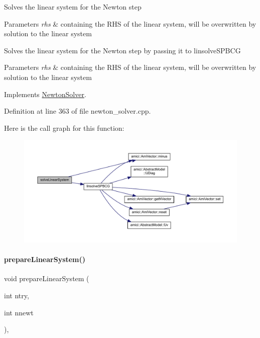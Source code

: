 Solves the linear system for the Newton step


\begin{DoxyParams}{Parameters}
{\em rhs} & containing the R\+HS of the linear system, will be overwritten by solution to the linear system \\
\hline
\end{DoxyParams}
Solves the linear system for the Newton step by passing it to linsolve\+S\+P\+B\+CG


\begin{DoxyParams}{Parameters}
{\em rhs} & containing the R\+HS of the linear system, will be overwritten by solution to the linear system\\
\hline
\end{DoxyParams}


Implements \mbox{\hyperlink{classamici_1_1_newton_solver_a761a5dc9e8cc7adfd4a392421df17c3d}{Newton\+Solver}}.



Definition at line 363 of file newton\+\_\+solver.\+cpp.

Here is the call graph for this function\+:
\nopagebreak
\begin{figure}[H]
\begin{center}
\leavevmode
\includegraphics[width=350pt]{classamici_1_1_newton_solver_iterative_aa4a6695d71f00ec1b46e94b33e55660f_cgraph}
\end{center}
\end{figure}
\mbox{\label{classamici_1_1_newton_solver_iterative_a0b900656d018299b08d0f027e95bd347}} 
\paragraph{\texorpdfstring{prepareLinearSystem()}{prepareLinearSystem()}}
{\footnotesize\ttfamily void prepare\+Linear\+System (\begin{DoxyParamCaption}\item[{int}]{ntry,  }\item[{int}]{nnewt }\end{DoxyParamCaption})\hspace{0.3cm}{\ttfamily [override]}, {\ttfamily [virtual]}}

